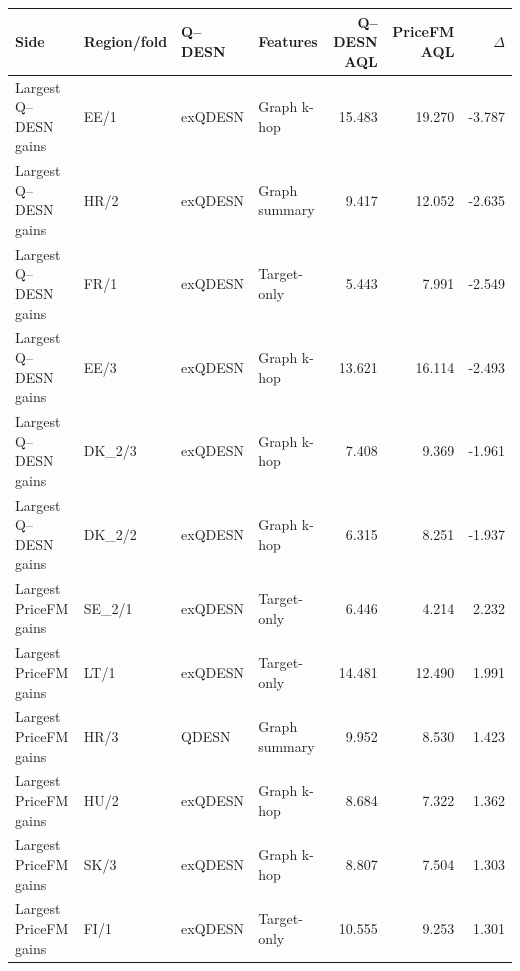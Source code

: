 \begin{tabular}{llllrrr}
\toprule
Side & Region/fold & Q--DESN & Features & Q--DESN AQL & PriceFM AQL & $\Delta$ \\
\midrule
Largest Q--DESN gains & EE/1 & exQDESN & Graph k-hop & 15.483 & 19.270 & -3.787 \\
Largest Q--DESN gains & HR/2 & exQDESN & Graph summary & 9.417 & 12.052 & -2.635 \\
Largest Q--DESN gains & FR/1 & exQDESN & Target-only & 5.443 & 7.991 & -2.549 \\
Largest Q--DESN gains & EE/3 & exQDESN & Graph k-hop & 13.621 & 16.114 & -2.493 \\
Largest Q--DESN gains & DK\_2/3 & exQDESN & Graph k-hop & 7.408 & 9.369 & -1.961 \\
Largest Q--DESN gains & DK\_2/2 & exQDESN & Graph k-hop & 6.315 & 8.251 & -1.937 \\
Largest PriceFM gains & SE\_2/1 & exQDESN & Target-only & 6.446 & 4.214 & 2.232 \\
Largest PriceFM gains & LT/1 & exQDESN & Target-only & 14.481 & 12.490 & 1.991 \\
Largest PriceFM gains & HR/3 & QDESN & Graph summary & 9.952 & 8.530 & 1.423 \\
Largest PriceFM gains & HU/2 & exQDESN & Graph k-hop & 8.684 & 7.322 & 1.362 \\
Largest PriceFM gains & SK/3 & exQDESN & Graph k-hop & 8.807 & 7.504 & 1.303 \\
Largest PriceFM gains & FI/1 & exQDESN & Target-only & 10.555 & 9.253 & 1.301 \\
\bottomrule
\end{tabular}
